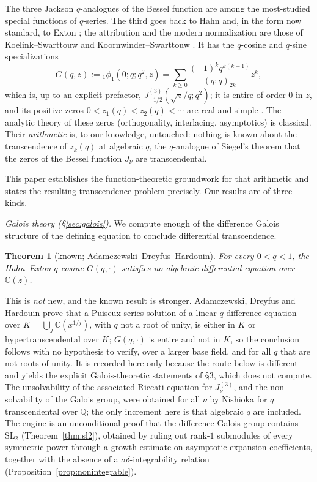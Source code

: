 \documentclass[11pt]{article}
\theoremstyle{plain}
\newtheorem{theorem}{Theorem}
\theoremstyle{definition}
\theoremstyle{remark}
\newcommand{\Q}{\mathbb{Q}}
\newcommand{\C}{\mathbb{C}}
\begin{document}
The three Jackson $q$-analogues of the Bessel function are among the most-studied special functions of
$q$-series. The third goes back to Hahn \cite{Hahn1949} and, in the form now standard, to
Exton \cite{Exton1978}; the attribution and the modern normalization are those of
Koelink--Swarttouw \cite{KS} and Koornwinder--Swarttouw \cite{KS1992}. It has the $q$-cosine and
$q$-sine specializations
\[
   G(q,z):={}_1\phi_1(0;q;q^2,z)=\sum_{k\ge0}\frac{(-1)^kq^{k(k-1)}}{(q;q)_{2k}}z^k,
\]
which is, up to an explicit prefactor, $J^{(3)}_{-1/2}(\sqrt z/q;q^2)$; it is entire of order $0$ in
$z$, and its positive zeros $0<z_1(q)<z_2(q)<\cdots$ are real and simple \cite{KS}. The analytic theory
of these zeros (orthogonality, interlacing, asymptotics) is classical. Their \emph{arithmetic}
is, to our knowledge, untouched: nothing is known about the transcendence of $z_k(q)$ at algebraic
$q$, the $q$-analogue of Siegel's theorem that the zeros of the Bessel function $J_\nu$ are
transcendental.

This paper establishes the function-theoretic groundwork for that arithmetic and states the resulting
transcendence problem precisely. Our results are of three kinds.

\emph{Galois theory (\S\ref{sec:galois}).} We compute enough of the difference Galois structure of the
defining equation to conclude differential transcendence.
\begin{theorem}[known; Adamczewski--Dreyfus--Hardouin]\label{thm:main-transc}
For every $0<q<1$, the Hahn--Exton $q$-cosine $G(q,\cdot)$ satisfies no algebraic differential
equation over $\C(z)$.
\end{theorem}

\noindent This is \emph{not} new, and the known result is stronger. Adamczewski, Dreyfus and
Hardouin \cite[Thm.~1.2, case $Q$]{ADH2021} prove that a Puiseux-series solution of a linear
$q$-difference equation over $K=\bigcup_j\C(x^{1/j})$, with $q$ not a root of unity, is either in
$K$ or hypertranscendental over $K$; $G(q,\cdot)$ is entire and not in $K$, so the conclusion
follows with no hypothesis to verify, over a larger base field, and for all $q$ that are not roots
of unity. It is recorded here only because the route below is different and yields the explicit
Galois-theoretic statements of \S3, which \cite{ADH2021} does not compute. The unsolvability of the
associated Riccati equation for $J^{(3)}_\nu$, and the non-solvability of the Galois group, were
obtained for all $\nu$ by Nishioka \cite{Nishioka2016} for $q$ transcendental over $\Q$; the only
increment here is that algebraic $q$ are included.
The engine is an unconditional proof that the difference Galois group contains $\mathrm{SL}_2$
(Theorem~\ref{thm:sl2}), obtained by ruling out rank-$1$ submodules of every symmetric power through a
growth estimate on asymptotic-expansion coefficients, together with the absence of a
$\sigma\delta$-integrability relation (Proposition~\ref{prop:nonintegrable}).
\end{document}

